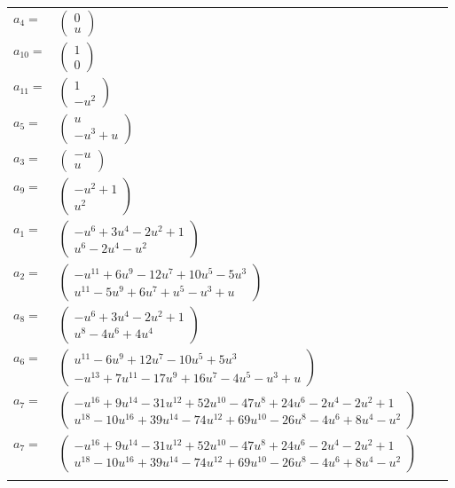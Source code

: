 \documentclass[1p]{elsarticle_modified}
\theoremstyle{definition}
\begin{document}
\begin{tabular}{m{7pt} m{180pt} m{7pt} m{180pt} }
\flushright $a_{4}=$&$\begin{pmatrix}0\\u\end{pmatrix}$ \\
\flushright $a_{10}=$&$\begin{pmatrix}1\\0\end{pmatrix}$ \\
\flushright $a_{11}=$&$\begin{pmatrix}1\\- u^2\end{pmatrix}$ \\
\flushright $a_{5}=$&$\begin{pmatrix}u\\- u^3+u\end{pmatrix}$ \\
\flushright $a_{3}=$&$\begin{pmatrix}- u\\u\end{pmatrix}$ \\
\flushright $a_{9}=$&$\begin{pmatrix}- u^2+1\\u^2\end{pmatrix}$ \\
\flushright $a_{1}=$&$\begin{pmatrix}- u^6+3 u^4-2 u^2+1\\u^6-2 u^4- u^2\end{pmatrix}$ \\
\flushright $a_{2}=$&$\begin{pmatrix}- u^{11}+6 u^9-12 u^7+10 u^5-5 u^3\\u^{11}-5 u^9+6 u^7+u^5- u^3+u\end{pmatrix}$ \\
\flushright $a_{8}=$&$\begin{pmatrix}- u^6+3 u^4-2 u^2+1\\u^8-4 u^6+4 u^4\end{pmatrix}$ \\
\flushright $a_{6}=$&$\begin{pmatrix}u^{11}-6 u^9+12 u^7-10 u^5+5 u^3\\- u^{13}+7 u^{11}-17 u^9+16 u^7-4 u^5- u^3+u\end{pmatrix}$ \\
\flushright $a_{7}=$&$\begin{pmatrix}- u^{16}+9 u^{14}-31 u^{12}+52 u^{10}-47 u^8+24 u^6-2 u^4-2 u^2+1\\u^{18}-10 u^{16}+39 u^{14}-74 u^{12}+69 u^{10}-26 u^8-4 u^6+8 u^4- u^2\end{pmatrix}$\\ \flushright $a_{7}=$&$\begin{pmatrix}- u^{16}+9 u^{14}-31 u^{12}+52 u^{10}-47 u^8+24 u^6-2 u^4-2 u^2+1\\u^{18}-10 u^{16}+39 u^{14}-74 u^{12}+69 u^{10}-26 u^8-4 u^6+8 u^4- u^2\end{pmatrix}$\\&\end{tabular}
\end{document}
